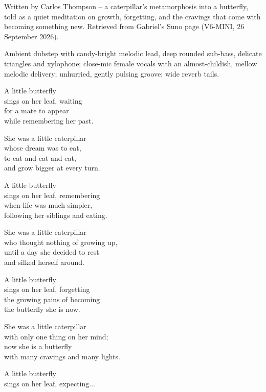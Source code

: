 
\begin{notes}
Written by Carlos Thompson -- a caterpillar's metamorphosis into a butterfly, told as a quiet meditation on growth, forgetting, and the cravings that come with becoming something new. Retrieved from Gabriel's Suno page (V6-MINI, 26 September 2026).
\end{notes}
\begin{style}
Ambient dubstep with candy-bright melodic lead, deep rounded sub-bass, delicate triangles and xylophone; close-mic female vocals with an almost-childish, mellow melodic delivery; unhurried, gently pulsing groove; wide reverb tails.
\end{style}
\begin{lyrics}
A little butterfly\\
sings on her leaf, waiting\\
for a mate to appear\\
while remembering her past.

She was a little caterpillar\\
whose dream was to eat,\\
to eat and eat and eat,\\
and grow bigger at every turn.

A little butterfly\\
sings on her leaf, remembering\\
when life was much simpler,\\
following her siblings and eating.

She was a little caterpillar\\
who thought nothing of growing up,\\
until a day she decided to rest\\
and silked herself around.

A little butterfly\\
sings on her leaf, forgetting\\
the growing pains of becoming\\
the butterfly she is now.

She was a little caterpillar\\
with only one thing on her mind;\\
now she is a butterfly\\
with many cravings and many lights.

A little butterfly\\
sings on her leaf, expecting...
\end{lyrics}


